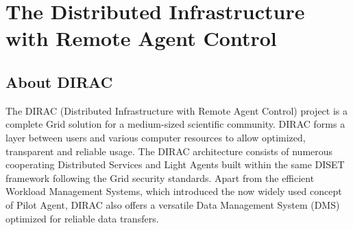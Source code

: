 \chapter{The Distributed Infrastructure with Remote Agent Control}

\section{About DIRAC}
The DIRAC (Distributed Infrastructure with Remote Agent Control) project is a complete Grid solution for a 
medium-sized scientific community. DIRAC forms a layer between users and various computer resources 
to allow optimized, transparent and reliable usage. The DIRAC architecture consists of numerous 
cooperating Distributed Services and Light Agents built within the same DISET framework following 
the Grid security standards. Apart from the efficient Workload Management Systems, which introduced
the now widely used concept of Pilot Agent, DIRAC also offers a versatile Data Management System (DMS) 
optimized for reliable data transfers. \cite{Dir2}

